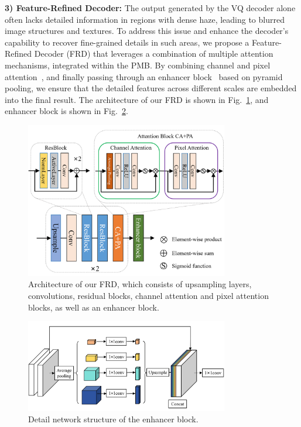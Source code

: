 \documentclass[journal]{IEEEtran}
\begin{document}
	{\bf{3) Feature-Refined Decoder:}} The output generated by the VQ decoder alone often lacks detailed information in regions with dense haze, leading to blurred image structures and textures. To address this issue and enhance the decoder's capability to recover fine-grained details in such areas, we propose a Feature-Refined Decoder (FRD) that leverages a combination of multiple attention mechanisms, integrated within the PMB. By combining channel and pixel attention~\cite{qin2020ffa}, and finally passing through an enhancer block~\cite{qu2019enhanced} based on pyramid pooling, we ensure that the detailed features across different scales are embedded into the final result. The architecture of our FRD is shown in Fig.~\ref{fig3}, and enhancer block is shown in Fig.~\ref{fig4}.

\begin{figure}[!t]
	\centering
	\includegraphics[width=3.49in]{images/enhanced_decoder}
	\caption{Architecture of our FRD, which consists of upsampling layers, convolutions, residual blocks, channel attention and pixel attention blocks, as well as an enhancer block. }
	\label{fig3}
\end{figure}
\begin{figure}[!t]
	\centering
	\includegraphics[width=3.49in]{images/enhancer_block}
	\caption{Detail network structure of the enhancer block.}
	\label{fig4}
\end{figure}
\end{document}
